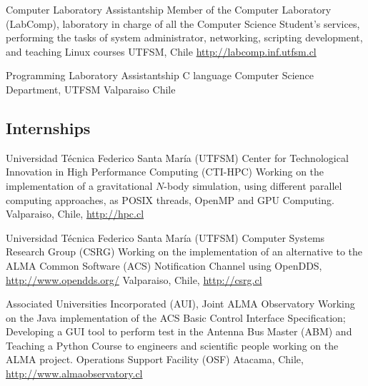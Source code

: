 \documentclass[11pt,a4paper]{moderncv}
\begin{document}
        {Computer Laboratory Assistantship}
        {Member of the Computer Laboratory (LabComp), laboratory in charge of all the Computer Science Student's services, performing the tasks of system administrator, networking, scripting development, and teaching Linux courses}
        {UTFSM, Chile}
        {\url{http://labcomp.inf.utfsm.cl}}{}

        {Programming Laboratory Assistantship}
        {C language}
        {Computer Science Department, UTFSM}
        {Valparaiso}
        {Chile}

\subsection{Internships}

        {Universidad Técnica Federico Santa María (UTFSM)}
        {Center for Technological Innovation in High Performance Computing (CTI-HPC)}
        {Working on the implementation of a gravitational $N$-body simulation, using different parallel computing approaches, as POSIX threads, OpenMP and GPU Computing.}
        {Valparaiso, Chile, \url{http://hpc.cl}}

        {Universidad Técnica Federico Santa María (UTFSM)}
        {Computer Systems Research Group (CSRG)}
        {Working on the implementation of an alternative to the ALMA Common Software (ACS) Notification Channel using OpenDDS, \url{http://www.opendds.org/}}
        {Valparaiso, Chile, \url{http://csrg.cl}}

        {Associated Universities Incorporated (AUI), Joint ALMA Observatory}
        {Working on the Java implementation of the ACS Basic Control Interface Specification; Developing a GUI tool to perform test in the Antenna Bus Master (ABM) and Teaching a Python Course to engineers and scientific people working on the ALMA project.}
        {Operations Support Facility (OSF)}
        {Atacama, Chile, \url{http://www.almaobservatory.cl}}
\end{document}
